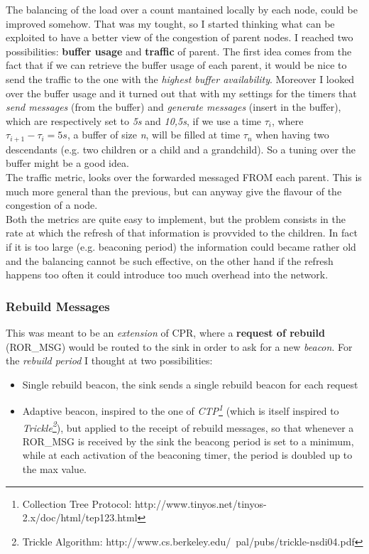 \documentclass{article}
\begin{document}
The balancing of the load over a count mantained locally by each node, could be improved somehow. That was my tought, so I started thinking what can be exploited to have a better view of the congestion of parent nodes. I reached two possibilities: \textbf{buffer usage} and \textbf{traffic} of parent. The first idea comes from the fact that if we can retrieve the buffer usage of each parent, it would be nice to send the traffic to the one with the \emph{highest buffer availability}. Moreover I looked over the buffer usage and it turned out that with my settings for the timers that \emph{send messages} (from the buffer) and \emph{generate messages} (insert in the buffer), which are respectively set to \textit{5s} and \textit{10,5s}, if we use a time $\tau_i$, where $\tau_{i+1}-\tau_{i}=5s$, a buffer of size \emph{n}, will be filled at time $\tau_n$ when having two descendants (e.g. two children or a child and a grandchild). So a tuning over the buffer might be a good idea.
\\ The traffic metric, looks over the forwarded messaged FROM each parent. This is much more general than the previous, but can anyway give the flavour of the congestion of a node.
\\Both the metrics are quite easy to implement, but the problem consists in the rate at which the refresh of that information is provvided to the children. In fact if it is too large (e.g. beaconing period) the information could became rather old and the balancing cannot be such effective, on the other hand if the refresh happens too often it could introduce too much overhead into the network.

		\subsubsection{Rebuild Messages}

This was meant to be an \textit{extension} of CPR, where a \textbf{request of rebuild} (ROR\_MSG) would be routed to the sink in order to ask for a new \emph{beacon}. For the \textit{rebuild period} I thought at two possibilities:
			\begin{itemize}
				\item Single rebuild beacon, the sink sends a single rebuild beacon for each request
				\item Adaptive beacon, inspired to the one of \emph{CTP\footnote{Collection Tree Protocol: http://www.tinyos.net/tinyos-2.x/doc/html/tep123.html}} (which is itself inspired to \emph{Trickle\footnote{Trickle Algorithm: http://www.cs.berkeley.edu/~pal/pubs/trickle-nsdi04.pdf}}), but applied to the receipt of rebuild messages, so that whenever a ROR\_MSG is received by the sink the beacong period is set to a minimum, while at each activation of the beaconing timer, the period is doubled up to the max value.
			\end{itemize}
		
\end{document}
